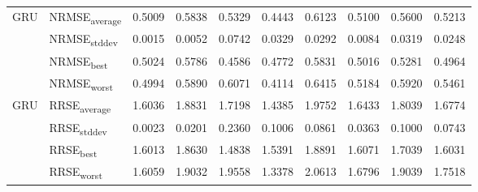{\begin{longtable}{l l c c c c c c c c}
\cmidrule(lr){2-10}
\multirow{4}{*}{GRU} & NRMSE\textsubscript{average} & 0.5009 & 0.5838 & 0.5329 & 0.4443 & 0.6123 & 0.5100 & 0.5600 & 0.5213 \\
 & NRMSE\textsubscript{stddev} & 0.0015 & 0.0052 & 0.0742 & 0.0329 & 0.0292 & 0.0084 & 0.0319 & 0.0248 \\
 & NRMSE\textsubscript{best} & 0.5024 & 0.5786 & 0.4586 & 0.4772 & 0.5831 & 0.5016 & 0.5281 & 0.4964 \\
 & NRMSE\textsubscript{worst} & 0.4994 & 0.5890 & 0.6071 & 0.4114 & 0.6415 & 0.5184 & 0.5920 & 0.5461 \\
\cmidrule(lr){2-10}
\multirow{4}{*}{GRU} & RRSE\textsubscript{average} & 1.6036 & 1.8831 & 1.7198 & 1.4385 & 1.9752 & 1.6433 & 1.8039 & 1.6774 \\
 & RRSE\textsubscript{stddev} & 0.0023 & 0.0201 & 0.2360 & 0.1006 & 0.0861 & 0.0363 & 0.1000 & 0.0743 \\
 & RRSE\textsubscript{best} & 1.6013 & 1.8630 & 1.4838 & 1.5391 & 1.8891 & 1.6071 & 1.7039 & 1.6031 \\
 & RRSE\textsubscript{worst} & 1.6059 & 1.9032 & 1.9558 & 1.3378 & 2.0613 & 1.6796 & 1.9039 & 1.7518 \\
\cmidrule(lr){2-10}
\end{longtable}
}
